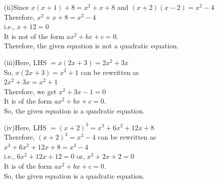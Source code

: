 \documentclass[a4paper,12pt]{article}
\begin{document}
\noindent (ii)\quad Since \(x(x+1) + 8 = x^2 + x + 8\) and \((x + 2)(x - 2) = x^2 - 4\) \\
\hspace*{1.7em}Therefore, \hspace*{3em} \(x^2 + x + 8 = x^2 - 4\) \\
\hspace*{1.8em} i.e., 
\hspace*{7em} \(x + 12 = 0\) \\
\hspace*{1.6em} It is not of the form \(ax^2 + bx + c = 0\). \\
\hspace*{1.6em} Therefore, the given equation is not a quadratic equation.

\vspace{1em}

\noindent (iii)\quad Here,
\hspace*{1.5em} LHS \(= x(2x + 3) = 2x^2 + 3x\) \\
\hspace*{1.5em} So, 
\hspace*{3em} \(x(2x + 3) = x^2 + 1\) can be rewritten as \\
\hspace*{7em} \(2x^2 + 3x = x^2 + 1\) \\
\hspace*{1.5em} Therefore, we get \hspace{1em} \(x^2 + 3x - 1 = 0\) \\
\hspace*{1.5em} It is of the form \(ax^2 + bx + c = 0\). \\
\hspace*{1.5em} So, the given equation is a quadratic equation.

\vspace{1em}

\noindent (iv)\quad Here, 
\hspace*{1.5em} LHS \(= (x+2)^3 = x^3 + 6x^2 + 12x + 8\) \\
\hspace*{1.5em} Therefore, 
\hspace*{3em} \((x+2)^3 = x^3 - 4\) can be rewritten as \\
\hspace*{6em} \(x^3 + 6x^2 + 12x + 8 = x^3 - 4\) \\
\hspace*{1.5em} i.e., 
\hspace*{4em} \(6x^2 + 12x + 12 = 0\) \quad or, \quad \(x^2 + 2x + 2 = 0\) \\
\hspace*{1.5em} It is of the form \(ax^2 + bx + c = 0\). \\
\hspace*{1.5em} So, the given equation is a quadratic equation.
\end{document}
